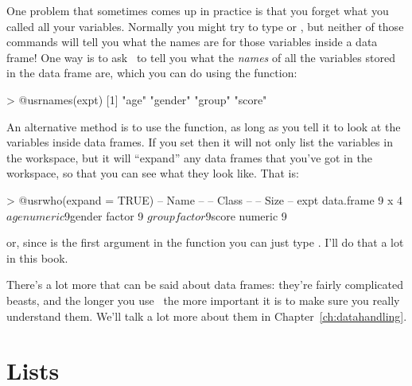 
One problem that sometimes comes up in practice is that you forget what you called all your variables. Normally you might try to type  or , but neither of those commands will tell you what the names are for those variables inside a data frame! One way is to ask \R\ to tell you what the {\it names} of all the variables stored in the data frame are, which you can do using the  function:
\begin{rblock1}
> @usr{names(expt)}
[1] "age"    "gender" "group"  "score" 
\end{rblock1}
An alternative method is to use the  function, as long as you tell it to look at the variables inside data frames. If you set  then it will not only list the variables in the workspace, but it will ``expand'' any data frames that you've got in the workspace, so that you can see what they look like. That is:
\begin{rblock1}
> @usr{who(expand = TRUE)}
   -- Name --   -- Class --   -- Size --
   expt         data.frame    9 x 4     
    $age        numeric       9         
    $gender     factor        9         
    $group      factor        9         
    $score      numeric       9         
\end{rblock1}
or, since  is the first argument in the  function you can just type . I'll do that a lot in this book.



There's a lot more that can be said about data frames: they're fairly complicated beasts, and the longer you use \R\ the more important it is to make sure you really understand them. We'll talk a lot more about them in Chapter~\ref{ch:datahandling}.







\section{Lists~\label{sec:lists}}

